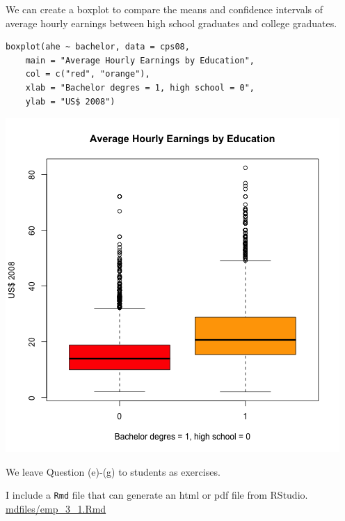 \documentclass[a4paper,11pt]{article}
\begin{document}
We can create a boxplot to compare the means and confidence intervals
of average hourly earnings between high school graduates and college
graduates.

\begin{verbatim}
boxplot(ahe ~ bachelor, data = cps08,
	main = "Average Hourly Earnings by Education",
	col = c("red", "orange"),
	xlab = "Bachelor degres = 1, high school = 0",
	ylab = "US$ 2008")
\end{verbatim}

\begin{center}
\includegraphics[width=.9\linewidth]{figure/boxplot.png}
\end{center}

We leave Question (e)-(g) to students as exercises.

I include a \texttt{Rmd} file that can generate an html or pdf file from
RStudio. \url{mdfiles/emp\_3\_1.Rmd}
\end{document}
